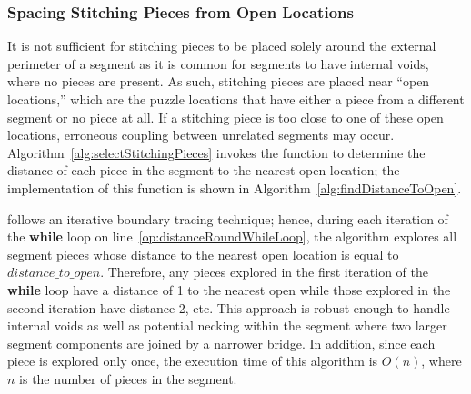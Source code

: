 \subsubsection{Spacing Stitching Pieces from Open Locations}\label{sec:determiningSpacingToNearestOpenLocation}

It is not sufficient for stitching pieces to be placed solely around the external perimeter of a segment as it is common for segments to have internal voids, where no pieces are present.  As such, stitching pieces are placed near ``open locations,'' which are the puzzle locations that have either a piece from a different segment or no piece at all. If a stitching piece is too close to one of these open locations, erroneous coupling between unrelated segments may occur.  Algorithm~\ref{alg:selectStitchingPieces} invokes the function  to determine the distance of each piece in the segment to the nearest open location; the implementation of this function is shown in Algorithm~\ref{alg:findDistanceToOpen}.  

 follows an iterative boundary tracing technique; hence, during each iteration of the \textbf{while} loop on line~\ref{op:distanceRoundWhileLoop}, the algorithm explores all segment pieces whose distance to the nearest open location is equal to $distance\_to\_open$.  Therefore, any pieces explored in the first iteration of the \textbf{while} loop have a distance of 1 to the nearest open while those explored in the second iteration have distance 2, etc. This approach is robust enough to handle internal voids as well as potential necking within the segment where two larger segment components are joined by a narrower bridge. In addition, since each piece is explored only once, the execution time of this algorithm is $O(n)$, where $n$ is the number of pieces in the segment.

